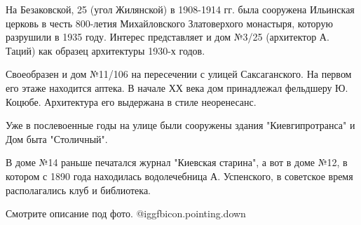На Безаковской, 25 (угол Жилянской) в 1908-1914 гг. была сооружена Ильинская
церковь в честь 800-летия Михайловского Златоверхого монастыря, которую
разрушили в 1935 году. Интерес представляет и дом №3/25 (архитектор А. Таций)
как образец архитектуры 1930-х годов.

Своеобразен и дом №11/106 на пересечении с улицей Саксаганского. На первом его
этаже находится аптека.  В начале ХХ века дом принадлежал фельдшеру Ю. Коцюбе.
Архитектура его выдержана в стиле неоренесанс.

Уже в послевоенные годы на улице были сооружены здания "Киевгипротранса" и Дом
быта "Столичный". 

В доме №14 раньше печатался журнал "Киевская старина", а вот в доме №12, в
котором с 1890 года находилась водолечебница А. Успенского, в советское время
располагались клуб и библиотека.

Смотрите описание под фото.  @igg{fbicon.pointing.down} 
